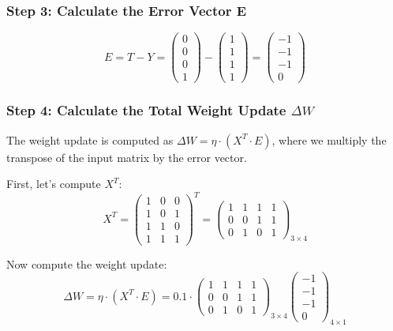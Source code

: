 \subsubsection{Step 3: Calculate the Error Vector E}
\[
E = T - Y =
\begin{pmatrix}
0 \\
0 \\
0 \\
1
\end{pmatrix}
-
\begin{pmatrix}
1 \\
1 \\
1 \\
1
\end{pmatrix}
=
\begin{pmatrix}
-1 \\
-1 \\
-1 \\
0
\end{pmatrix}
\]

\subsubsection{Step 4: Calculate the Total Weight Update \(\Delta W\)}
The weight update is computed as \(\Delta W = \eta \cdot (X^T \cdot E)\), where we multiply the transpose of the input matrix by the error vector.

First, let's compute \(X^T\):
\[
X^T = \begin{pmatrix}
1 & 0 & 0 \\
1 & 0 & 1 \\
1 & 1 & 0 \\
1 & 1 & 1
\end{pmatrix}^T = \begin{pmatrix}
1 & 1 & 1 & 1 \\
0 & 0 & 1 & 1 \\
0 & 1 & 0 & 1
\end{pmatrix}_{3 \times 4}
\]

Now compute the weight update:
\[
\Delta W = \eta \cdot (X^T \cdot E) = 0.1 \cdot \begin{pmatrix}
1 & 1 & 1 & 1 \\
0 & 0 & 1 & 1 \\
0 & 1 & 0 & 1
\end{pmatrix}_{3 \times 4} \begin{pmatrix}
-1 \\
-1 \\
-1 \\
0
\end{pmatrix}_{4 \times 1}
\]

